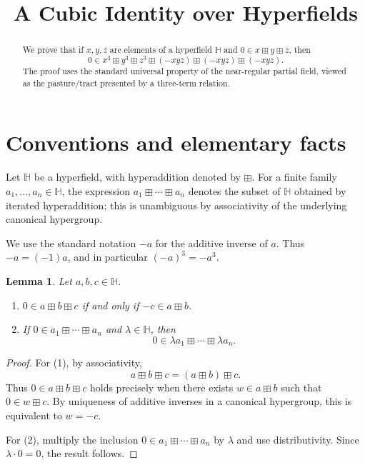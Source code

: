 \documentclass[11pt]{article}
\title{A Cubic Identity over Hyperfields}
\author{}
\date{}
\newtheorem{lemma}[theorem]{Lemma}
\theoremstyle{remark}
\begin{document}
\maketitle

\begin{abstract}
We prove that if \(x,y,z\) are elements of a hyperfield \(\mathbb H\) and
\(0\in x\boxplus y\boxplus z\), then
\[
0\in x^3\boxplus y^3\boxplus z^3
\boxplus(-xyz)\boxplus(-xyz)\boxplus(-xyz).
\]
The proof uses the standard universal property of the near-regular partial field,
viewed as the pasture/tract presented by a three-term relation.
\end{abstract}

\section{Conventions and elementary facts}

Let \(\mathbb H\) be a hyperfield, with hyperaddition denoted by \(\boxplus\).
For a finite family \(a_1,\dots,a_n\in \mathbb H\), the expression
\(a_1\boxplus\cdots\boxplus a_n\) denotes the subset of \(\mathbb H\) obtained by
iterated hyperaddition; this is unambiguous by associativity of the underlying
canonical hypergroup.

We use the standard notation \(-a\) for the additive inverse of \(a\). Thus
\(-a=(-1)a\), and in particular \((-a)^3=-a^3\).

\begin{lemma}\label{lem:basic}
Let \(a,b,c\in \mathbb H\).
\begin{enumerate}
\item \(0\in a\boxplus b\boxplus c\) if and only if \(-c\in a\boxplus b\).
\item If \(0\in a_1\boxplus\cdots\boxplus a_n\) and \(\lambda\in \mathbb H\), then
\[
0\in \lambda a_1\boxplus\cdots\boxplus \lambda a_n .
\]
\end{enumerate}
\end{lemma}

\begin{proof}
For (1), by associativity,
\[
a\boxplus b\boxplus c=(a\boxplus b)\boxplus c.
\]
Thus \(0\in a\boxplus b\boxplus c\) holds precisely when there exists
\(w\in a\boxplus b\) such that \(0\in w\boxplus c\). By uniqueness of additive
inverses in a canonical hypergroup, this is equivalent to \(w=-c\).

For (2), multiply the inclusion \(0\in a_1\boxplus\cdots\boxplus a_n\) by
\(\lambda\) and use distributivity. Since \(\lambda\cdot 0=0\), the result follows.
\end{proof}
\end{document}
